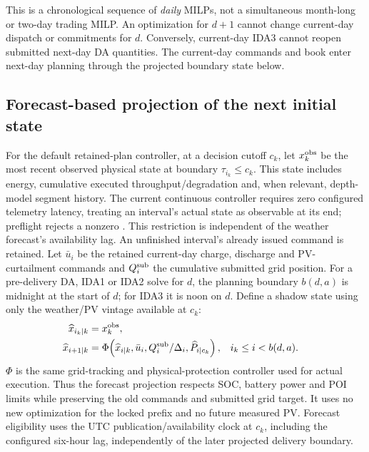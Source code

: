 \documentclass[11pt,a4paper]{article}
\begin{document}
This is a chronological sequence of \emph{daily} MILPs, not a simultaneous
month-long or two-day trading MILP. An optimization for $d+1$ cannot change
current-day dispatch or commitments for $d$. Conversely, current-day IDA3
cannot reopen submitted next-day DA quantities. The current-day commands and
book enter next-day planning through the projected boundary state below.

\subsection{Forecast-based projection of the next initial state}
For the default retained-plan controller, at a decision cutoff $c_k$, let $x_k^{\rm obs}$ be the most recent observed
physical state at boundary $\tau_{i_k}\le c_k$. This state includes energy,
cumulative executed throughput/degradation and, when relevant, depth-model
segment history. The current continuous controller requires zero configured
telemetry latency, treating an interval's actual state as observable at its
end; preflight rejects a nonzero .
This restriction is independent of the weather forecast's availability lag.
An unfinished interval's already issued command is retained.
Let $\bar u_i$ be the retained current-day charge, discharge and PV-curtailment
commands and $Q_i^{\rm sub}$ the cumulative submitted grid position. For a
pre-delivery DA, IDA1 or IDA2 solve for $d$, the planning boundary $b(d,a)$ is
midnight at the start of $d$; for IDA3 it is noon on $d$. Define a shadow state
using only the weather/PV vintage available at $c_k$:
\begin{align}
 \widehat x_{i_k\mid k}&=x_k^{\rm obs},\\
 \widehat x_{i+1\mid k}
 &=\Phi\!\left(\widehat x_{i\mid k},\bar u_i,
        Q_i^{\rm sub}/\Delta_i,\widehat P_{i\mid c_k}\right),
       &&i_k\le i<b(d,a). \label{eq:continuous-shadow}
\end{align}
$\Phi$ is the same grid-tracking and physical-protection controller used for
actual execution. Thus the forecast projection respects SOC, battery power and
POI limits while preserving the old commands and submitted grid target. It
uses no new optimization for the locked prefix and no future measured PV.
Forecast eligibility uses the UTC publication/availability clock at $c_k$,
including the configured six-hour lag, independently of the later projected
delivery boundary.
\end{document}
